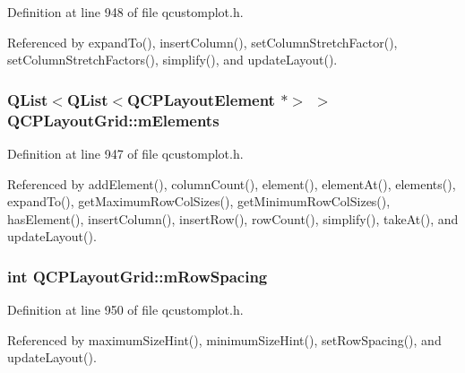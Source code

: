 Definition at line 948 of file qcustomplot.\+h.



Referenced by expand\+To(), insert\+Column(), set\+Column\+Stretch\+Factor(), set\+Column\+Stretch\+Factors(), simplify(), and update\+Layout().

\hypertarget{class_q_c_p_layout_grid_a2ec4664bcfb5d479255e50f0c074f7c9}{}
\subsubsection[{m\+Elements}]{\setlength{\rightskip}{0pt plus 5cm}Q\+List$<$Q\+List$<${\bf Q\+C\+P\+Layout\+Element} $\ast$$>$ $>$ Q\+C\+P\+Layout\+Grid\+::m\+Elements\hspace{0.3cm}{\ttfamily [protected]}}\label{class_q_c_p_layout_grid_a2ec4664bcfb5d479255e50f0c074f7c9}


Definition at line 947 of file qcustomplot.\+h.



Referenced by add\+Element(), column\+Count(), element(), element\+At(), elements(), expand\+To(), get\+Maximum\+Row\+Col\+Sizes(), get\+Minimum\+Row\+Col\+Sizes(), has\+Element(), insert\+Column(), insert\+Row(), row\+Count(), simplify(), take\+At(), and update\+Layout().

\hypertarget{class_q_c_p_layout_grid_a8b67f183f4645739cc4c794d75843b40}{}
\subsubsection[{m\+Row\+Spacing}]{\setlength{\rightskip}{0pt plus 5cm}int Q\+C\+P\+Layout\+Grid\+::m\+Row\+Spacing\hspace{0.3cm}{\ttfamily [protected]}}\label{class_q_c_p_layout_grid_a8b67f183f4645739cc4c794d75843b40}


Definition at line 950 of file qcustomplot.\+h.



Referenced by maximum\+Size\+Hint(), minimum\+Size\+Hint(), set\+Row\+Spacing(), and update\+Layout().

\hypertarget{class_q_c_p_layout_grid_a36c85a7eaf342680fb9b8a4977486f16}{}
